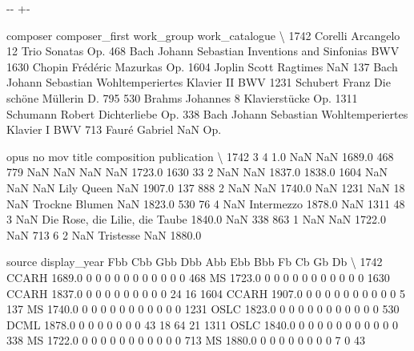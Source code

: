 \documentclass[letterpaper,10pt,english]{sphinxmanual}
\newlength\nbsphinxcodecellspacing
\begin{document}
{

\kern-\sphinxverbatimsmallskipamount\kern-\baselineskip
\kern+\FrameHeightAdjust\kern-\fboxrule
\vspace{\nbsphinxcodecellspacing}

\begin{sphinxVerbatim}[commandchars=\\\{\}]
\llap{\color{nbsphinxout}[6]:\,\hspace{\fboxrule}\hspace{\fboxsep}}      composer    composer\_first                   work\_group work\_catalogue  \textbackslash{}
1742   Corelli         Arcangelo              12 Trio Sonatas           Op.
468       Bach  Johann Sebastian     Inventions and Sinfonias            BWV
1630    Chopin          Frédéric                     Mazurkas            Op.
1604    Joplin             Scott                     Ragtimes            NaN
137       Bach  Johann Sebastian  Wohltemperiertes Klavier II            BWV
1231  Schubert             Franz          Die schöne Müllerin         D. 795
530     Brahms          Johannes              8 Klavierstücke            Op.
1311  Schumann            Robert                 Dichterliebe            Op.
338       Bach  Johann Sebastian   Wohltemperiertes Klavier I            BWV
713      Fauré           Gabriel                          NaN            Op.

     opus   no  mov                           title  composition  publication  \textbackslash{}
1742    3    4  1.0                             NaN          NaN       1689.0
468   779  NaN  NaN                             NaN          NaN       1723.0
1630   33    2  NaN                             NaN       1837.0       1838.0
1604  NaN  NaN  NaN                      Lily Queen          NaN       1907.0
137   888    2  NaN                             NaN       1740.0          NaN
1231  NaN   18  NaN                  Trockne Blumen          NaN       1823.0
530    76    4  NaN                      Intermezzo       1878.0          NaN
1311   48    3  NaN  Die Rose, die Lilie, die Taube       1840.0          NaN
338   863    1  NaN                             NaN       1722.0          NaN
713     6    2  NaN                       Tristesse          NaN       1880.0

     source  display\_year  Fbb  Cbb  Gbb  Dbb  Abb  Ebb  Bbb  Fb  Cb  Gb  Db  \textbackslash{}
1742  CCARH        1689.0    0    0    0    0    0    0    0   0   0   0   0
468      MS        1723.0    0    0    0    0    0    0    0   0   0   0   0
1630  CCARH        1837.0    0    0    0    0    0    0    0   0   0  24  16
1604  CCARH        1907.0    0    0    0    0    0    0    0   0   0   0   5
137      MS        1740.0    0    0    0    0    0    0    0   0   0   0   0
1231   OSLC        1823.0    0    0    0    0    0    0    0   0   0   0   0
530    DCML        1878.0    0    0    0    0    0    0    0  43  18  64  21
1311   OSLC        1840.0    0    0    0    0    0    0    0   0   0   0   0
338      MS        1722.0    0    0    0    0    0    0    0   0   0   0   0
713      MS        1880.0    0    0    0    0    0    0    0   0   7   0  43


\end{sphinxVerbatim}}
\end{document}
